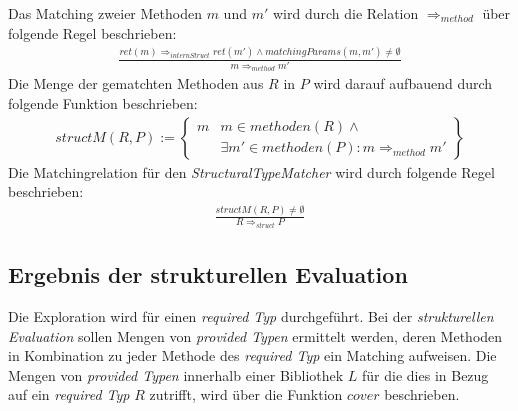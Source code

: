 \noindent
Das Matching zweier Methoden $m$ und $m'$ wird durch die Relation $\Rightarrow_{method}$ über folgende Regel beschrieben:
\begin{gather*}
\frac{\mathit{ret(m)} \Rightarrow_{internStruct} \mathit{ret(m')} \wedge \mathit{matchingParams(m,m')} \neq \emptyset}{m \Rightarrow_{method} m'}
\end{gather*}
\noindent
Die Menge der gematchten Methoden aus $R$ in $P$ wird darauf aufbauend durch folgende Funktion beschrieben:
\begin{gather*}
structM(R,P) := \left\{ 
				\begin{array}{l|l}
m	& \mathit{m} \in \mathit{methoden(R)} \wedge \mathit{ }
\\
	& \exists \mathit{m'} \in \mathit{methoden(P)} : m \Rightarrow_{method} m'
				\end{array}
              \right\}
\end{gather*}
\noindent
Die Matchingrelation für den \emph{StructuralTypeMatcher} wird durch folgende Regel beschrieben:
\begin{gather*}
\frac{structM(R,P) \neq \emptyset}{R \Rightarrow_{struct}P}
\end{gather*}


\subsection{Ergebnis der strukturellen Evaluation}\label{sec_ergStructEval}
Die Exploration wird für einen \emph{required Typ} durchgeführt. Bei der \emph{strukturellen Evaluation} sollen Mengen von \emph{provided Typen} ermittelt werden, deren Methoden in Kombination zu jeder Methode des \emph{required Typ} ein Matching aufweisen. Die Mengen von \emph{provided Typen} innerhalb einer Bibliothek $L$ für die dies in Bezug auf ein \emph{required Typ} $R$ zutrifft, wird über die Funktion $cover$ beschrieben.

